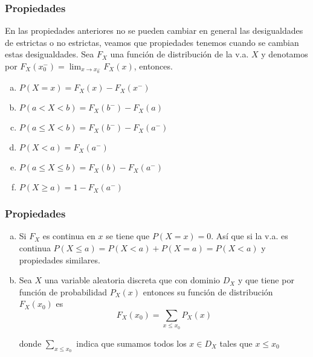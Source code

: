 \documentclass[handout]{beamer}\usepackage[]{graphicx}\usepackage[]{color}
\renewcommand{\leq}{\leqslant}
\renewcommand{\geq}{\geqslant}
\theoremstyle{plain}
\newtheorem{prop}{Propiedades}
\theoremstyle{definition}
\begin{document}
\begin{frame}

\frametitle{Propiedades}

En las propiedades anteriores no se pueden cambiar en general las desigualdades de
estrictas o no estrictas, veamos que propiedades tenemos cuando se cambian estas
desigualdades.
           Sea $F_{X}$ una función de distribución de la v.a. $X$ y denotamos
           por $F_{X}(x_{0}^{-})=\displaystyle \lim_{x\to x_{0}^{-}} F_{X}(x)$, entonces.
           \begin{enumerate}[a)]
           \item $P(X=x)=F_{X}(x)-F_{X}(x^{-})$
           \item $P(a< X< b)=F_{X}(b^{-})-F_{X}(a)$
           \item $P(a\leq X< b)=F_{X}(b^{-})-F_{X}(a^{-})$
           \item $P(X<a)=F_{X}(a^{-})$
           \item $P(a\leq X\leq b)=F_{X}(b)-F_{X}(a^{-})$
           \item $P(X\geq a)=1-F_{X}(a^{-})$
        \end{enumerate}
\end{frame}


\begin{frame}

\frametitle{Propiedades}
\begin{enumerate}[a)]
\item Si  $F_X$ es continua en $x$ se tiene que $P(X=x)=0$.
Así que si la v.a. es continua $P(X\leq a)=P(X< a)+P(X=a)=P(X<a)$ y propiedades similares.
\item  Sea $X$ una variable aleatoria discreta que con dominio $D_X$ y
que tiene por función de probabilidad $P_{X}(x)$ entonces su función de distribución
$F_{X}(x_0)$ es
$$F_{X}(x_0)=\sum_{x\leq x_{0}} P_{X}(x)$$

donde $\sum_{x\leq x_{0}}$ indica que sumamos todos los $x \in D_X$ tales que $x\leq
x_{0}$
\end{enumerate}
\end{frame}
\end{document}
